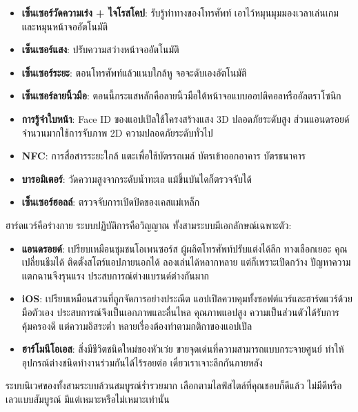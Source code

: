 \begin{itemize}
  \item \textbf{เซ็นเซอร์วัดความเร่ง + ไจโรสโคป}: รับรู้ท่าทางของโทรศัพท์ เอาไว้หมุนมุมมองเวลาเล่นเกม และหมุนหน้าจออัตโนมัติ
  \item \textbf{เซ็นเซอร์แสง}: ปรับความสว่างหน้าจออัตโนมัติ
  \item \textbf{เซ็นเซอร์ระยะ}: ตอนโทรศัพท์แล้วแนบใกล้หู จอจะดับเองอัตโนมัติ
  \item \textbf{เซ็นเซอร์ลายนิ้วมือ}: ตอนนี้กระแสหลักคือลายนิ้วมือใต้หน้าจอแบบออปติคอลหรืออัลตราโซนิก
  \item \textbf{การรู้จำใบหน้า}: Face ID ของแอปเปิลใช้โครงสร้างแสง 3D ปลอดภัยระดับสูง ส่วนแอนดรอยด์จำนวนมากใช้การจับภาพ 2D ความปลอดภัยระดับทั่วไป
  \item \textbf{NFC}: การสื่อสารระยะใกล้ แตะเพื่อใช้บัตรรถเมล์ บัตรเข้าออกอาคาร บัตรธนาคาร
  \item \textbf{บารอมิเตอร์}: วัดความสูงจากระดับน้ำทะเล แม้ขึ้นบันไดก็ตรวจจับได้
  \item \textbf{เซ็นเซอร์ฮอลล์}: ตรวจจับการเปิดปิดของเคสแม่เหล็ก
\end{itemize}


ฮาร์ดแวร์คือร่างกาย ระบบปฏิบัติการคือวิญญาณ ทั้งสามระบบมีเอกลักษณ์เฉพาะตัว:

\begin{itemize}
  \item \textbf{แอนดรอยด์}: เปรียบเหมือนชุมชนโอเพนซอร์ส ผู้ผลิตโทรศัพท์ปรับแต่งได้ลึก ทางเลือกเยอะ คุณเปลี่ยนธีมได้ ติดตั้งสโตร์แอปภายนอกได้ ลองเล่นได้หลากหลาย แต่ก็เพราะเปิดกว้าง ปัญหาความแตกฉานจึงรุนแรง ประสบการณ์ต่างแบรนด์ต่างกันมาก
  \item \textbf{iOS}: เปรียบเหมือนสวนที่ถูกจัดการอย่างประณีต แอปเปิลควบคุมทั้งซอฟต์แวร์และฮาร์ดแวร์ด้วยมือตัวเอง ประสบการณ์จึงเป็นเอกภาพและลื่นไหล คุณภาพแอปสูง ความเป็นส่วนตัวได้รับการคุ้มครองดี แต่ความอิสระต่ำ หลายเรื่องต้องทำตามกติกาของแอปเปิล
  \item \textbf{ฮาร์โมนีโอเอส}: สิ่งมีชีวิตชนิดใหม่ของหัวเว่ย ขายจุดเด่นที่ความสามารถแบบกระจายศูนย์ ทำให้อุปกรณ์ต่างชนิดทำงานร่วมกันได้ไร้รอยต่อ เดี๋ยวเราเจาะลึกกันภายหลัง
\end{itemize}

ระบบนิเวศของทั้งสามระบบล้วนสมบูรณ์ร่ำรวยมาก เลือกตามไลฟ์สไตล์ที่คุณชอบก็ดีแล้ว ไม่มีดีหรือเลวแบบสัมบูรณ์ มีแต่เหมาะหรือไม่เหมาะเท่านั้น



